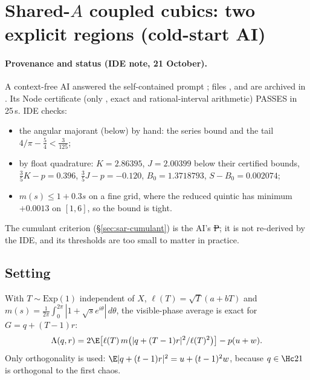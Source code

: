 \section{Shared-$A$ coupled cubics: two explicit regions (cold-start AI)}\label{ch:shared-a-regions}

\paragraph{Provenance and status (IDE note, 21 October).} A context-free AI answered the self-contained prompt ; files
,  and  are archived in . Its Node certificate (only
, exact and rational-interval arithmetic) PASSES in 25\,s. IDE checks:
\begin{itemize}
\item the angular majorant (below) by hand: the series bound and the tail $4/\pi-\frac54<\frac3{125}$;
\item by float quadrature: $K=2.86395$, $J=2.00399$ below their certified bounds, $\frac35K-p=0.396$, $\frac35J-p=-0.120$,
$B_0=1.3718793$, $S-B_0=0.002074$;
\item $m(s)\le1+0.3s$ on a fine grid, where the reduced quintic has minimum $+0.0013$ on $[1,6]$, so the bound is tight.
\end{itemize}
The cumulant criterion (§\ref{sec:sar-cumulant}) is the AI's \st{P}; it is not re-derived by the IDE, and its thresholds are too small to matter in practice.

\subsection{Setting}
With $T\sim\mathrm{Exp}(1)$ independent of $X$, $\ell(T)=\sqrt T(a+bT)$ and $m(s)=\frac1{2\pi}\int_0^{2\pi}|1+\sqrt se^{i\theta}|\,d\theta$, the visible-phase average is exact
for $G=q+(T-1)r$:
\[
\Lambda(q,r)=2\E\bigl[\ell(T)\,m\bigl(|q+(T-1)r|^2/\ell(T)^2\bigr)\bigr]-p(u+w).
\]
Only orthogonality is used: $\E|q+(t-1)r|^2=u+(t-1)^2w$, because $q\in\Hc21$ is orthogonal to the first chaos.

